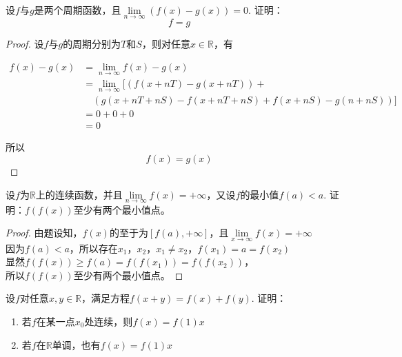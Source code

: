 \begin{proposition}
    
    设$f$与$g$是两个周期函数，且$\lim\limits_{n \to \infty}{(f(x) - g(x))} =  0$.
    证明：
    \[f = g \]

\end{proposition}

\begin{proof}
    
    设$f$与$g$的周期分别为$T$和$S$，则对任意$x \in \mathbb{R}$，有
    
    \begin{align*}
        f(x) - g(x) & = \lim\limits_{n \to \infty}{f(x) - g(x)} \\
        & = \lim\limits_{n \to \infty}[(f(x + nT) - g(x + nT)) + \\
        & \quad(g(x + nT + nS) - f(x + nT + nS) + f(x + nS) - g(n + nS))] \\
        & = 0 + 0 + 0 \\
        & = 0
    \end{align*}

    所以
    \[f(x) = g(x)\]

\end{proof}

\begin{proposition}
    
    设$f$为$\mathbb{R}$上的连续函数，并且$\lim\limits_{n \to \infty}{f(x)} = +\infty$，又设$f$的最小值$f(a) < a$.
    证明：$f(f(x))$至少有两个最小值点。

\end{proposition}

\begin{proof}
    
    由题设知，$f(x)$的至于为$[f(a), +\infty]$，且$\lim\limits_{x \to \infty}{f(x)} = +\infty$ \\
    因为$f(a) < a$，所以存在$x_1$，$x_2$，$x_1 \neq x_2$，$f(x_1) = a = f(x_2)$ \\
    显然$f(f(x)) \geq f(a) = f(f(x_1)) = f(f(x_2))$，\\
    所以$f(f(x))$至少有两个最小值点。

\end{proof}

\begin{proposition}[Cauthy方程]
    
    设$f$对任意$x, y \in \mathbb{R}$，满足方程$f(x + y) = f(x) + f(y)$. 证明：

    \begin{enumerate}

        \item 若$f$在某一点$x_0$处连续，则$f(x) = f(1)x$
        
        \item 若$f$在$\mathbb{R}$单调，也有$f(x) = f(1)x$
        
    \end{enumerate}

\end{proposition}

